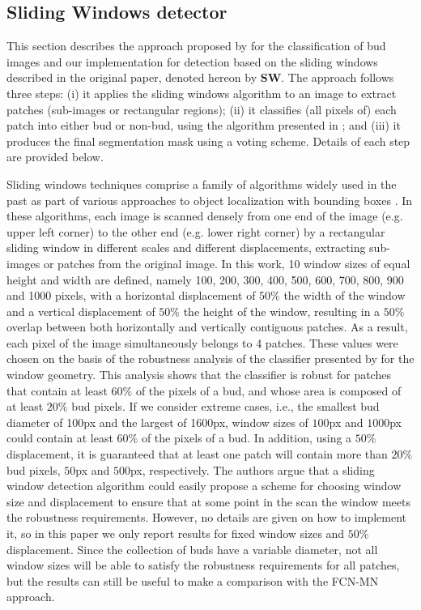 \documentclass[a4paper,authoryear,review]{elsarticle}
\begin{document}
\subsection{Sliding Windows detector}
\label{sec:sw}

This section describes the approach proposed by \citet{perez2017image} for the classification of bud images and our implementation for detection based on the sliding windows described in the original paper, denoted hereon by \textbf{SW}. The approach follows three steps: (i) it applies the sliding windows algorithm to an image to extract patches (sub-images or rectangular regions); (ii) it classifies (all pixels of) each patch into either bud or non-bud, using the algorithm presented in \citet{perez2017image}; and (iii) it produces the final segmentation mask using a voting scheme. Details of each step are provided below.

Sliding windows techniques comprise a family of algorithms widely used in the past as part of various approaches to object localization with bounding boxes \citep{divvala2009empirical, wang2009hog, chum2007exemplar, ferrari2007groups, dalal2005histograms, rowley1996human}. In these algorithms, each image is scanned densely from one end of the image (e.g. upper left corner) to the other end (e.g. lower right corner) by a rectangular sliding window in different scales and different displacements, extracting sub-images or patches from the original image. In this work, 10 window sizes of equal height and width are defined, namely 100, 200, 300, 400, 500, 600, 700, 800, 900 and 1000 pixels, with a horizontal displacement of $50\%$ the width of the window and a vertical displacement of $50\%$ the height of the window, resulting in a $50\%$ overlap between both horizontally and vertically contiguous patches. As a result, each pixel of the image simultaneously belongs to 4 patches. These values were chosen on the basis of the robustness analysis of the classifier presented by \citet{perez2017image} for the window geometry. This analysis shows that the classifier is robust for patches that contain at least $60\%$ of the pixels of a bud, and whose area is composed of at least $20\%$ bud pixels. If we consider extreme cases, i.e., the smallest bud diameter of 100px and the largest of 1600px, window sizes of $100$px and $1000$px could contain at least $60\%$ of the pixels of a bud. In addition, using a $50\%$ displacement, it is guaranteed that at least one patch will contain more than $20\%$ bud pixels, $50$px and $500$px, respectively. The authors argue that a sliding window detection algorithm could easily propose a scheme for choosing window size and displacement to ensure that at some point in the scan the window meets the robustness requirements. However, no details are given on how to implement it, so in this paper we only report results for fixed window sizes and $50\%$ displacement. Since the collection of buds have a variable diameter, not all window sizes will be able to satisfy the robustness requirements for all patches, but the results can still be useful to make a comparison with the FCN-MN approach.  
\end{document}
